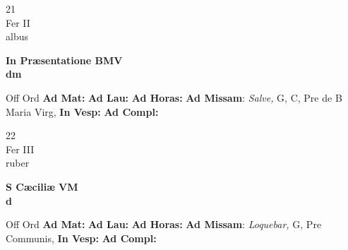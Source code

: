 \documentclass[10pt, openany]{book}
\begin{document}
        \begin{center}
            \begin{minipage}{3.5in}
                \vspace{2em}
                \begin{minipage}{0.5in}
                    {\Huge 21} \\
                    {\normalsize Fer II} \\
                    {\normalsize albus}
                \end{minipage}
                \begin{minipage}{3.0in}
                    \textbf{ \large In Præsentatione BMV \\
                    \textnormal{\normalsize dm}} \\ 
                \end{minipage}
                \begin{justify}Off Ord
                    \textbf{Ad Mat: }
                    \textbf{Ad Lau: }
                    \textbf{Ad Horas: }\textbf{Ad Missam}: \textit{Salve,} G, C, Pre de B Maria Virg,  
                    \textbf{In Vesp: }
                    \textbf{Ad Compl: }
                \end{justify}
            \end{minipage}
        \end{center}
    
        \begin{center}
            \begin{minipage}{3.5in}
                \vspace{2em}
                \begin{minipage}{0.5in}
                    {\Huge 22} \\
                    {\normalsize Fer III} \\
                    {\normalsize ruber}
                \end{minipage}
                \begin{minipage}{3.0in}
                    \textbf{ \large S Cæciliæ VM \\
                    \textnormal{\normalsize d}} \\ 
                \end{minipage}
                \begin{justify}Off Ord
                    \textbf{Ad Mat: }
                    \textbf{Ad Lau: }
                    \textbf{Ad Horas: }\textbf{Ad Missam}: \textit{Loquebar,} G, Pre Communis,  
                    \textbf{In Vesp: }
                    \textbf{Ad Compl: }
                \end{justify}
            \end{minipage}
        \end{center}
    
\end{document}

